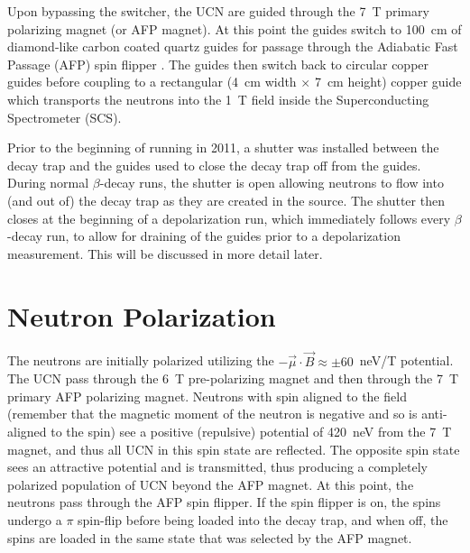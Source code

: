 Upon bypassing the switcher,
the UCN are guided through the 7~T primary polarizing magnet (or AFP magnet). At this point
the guides switch to 100~cm of diamond-like carbon coated quartz guides \cite{mammei2010thin}
for passage through the Adiabatic Fast Passage (AFP) spin flipper \cite{holley2012high}.
The guides then switch back to circular copper guides before coupling to a rectangular
(4~cm width $\times$ 7~cm height) copper guide which transports the neutrons into the 1~T field
inside the Superconducting Spectrometer (SCS).

Prior to the beginning of running in 2011, a shutter was installed between the decay trap and
the guides used to close the decay trap off from the guides. During normal $\beta$-decay
runs, the shutter is open allowing neutrons to flow into (and out of) the decay trap as they are
created in the source. The shutter then closes at the beginning of a depolarization run, which immediately
follows every $\beta$-decay run, to allow for draining of the guides prior to a depolarization
measurement. This will be discussed in more detail later.

\section{Neutron Polarization} \label{sec:polarization}

The neutrons are initially polarized utilizing the $-\vec{\mu}\cdot \vec{B} \approx \pm 60$~neV/T
potential. The UCN pass through the 6~T pre-polarizing magnet and then
through the 7~T primary AFP polarizing magnet. Neutrons with spin
aligned to the field (remember that the magnetic moment of the neutron is negative and so is anti-aligned
to the spin) see a positive (repulsive) potential of 420~neV from the 7~T magnet, and thus all
UCN in this spin state are reflected. The opposite spin state sees an attractive potential
and is transmitted, thus producing
a completely polarized population of UCN beyond the AFP magnet.
At this point, the neutrons pass through the AFP spin flipper. If the spin flipper is on, the spins
undergo a $\pi$ spin-flip before being loaded into the decay trap, and when off, the spins are
loaded in the same state that was selected by the AFP magnet.

